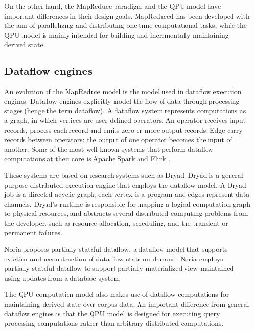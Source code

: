 On the other hand, the MapReduce paradigm and the QPU model have important differences in their design goals.
MapReduced has been developed with the aim of parallelizing and distributing one-time computational tasks,
while the QPU model is mainly intended for building and incrementally maintaining derived state.

\subsection{Dataflow engines}
An evolution of the MapReduce model is the model used in dataflow execution engines.
Dataflow engines explicitly model the flow of data through processing stages (henge the term dataflow).
A dataflow system represents computations as a graph, in which vertices are user-defined operators.
An operator receives input records, process each record and emits zero or more output records.
Edge carry records between operators; the output of one operator becomes the input of another.
Some of the most well known systems that perform dataflow computations at their core is
Apache Spark \cite{zaharia:spark} and Flink \cite{carbone:flink}.

These systems are based on research systems such as Dryad.
Dryad \cite{isard:dryad} is a general-purpose distributed execution engine that employs the dataflow model.
A Dryad job is a directed acyclic graph; each vertex is a program and edges represent data channels.
Dryad's runtime is responsible for mapping a logical computation graph to physical resources,
and abstracts several distributed computing problems from the developer,
such as resource allocation, scheduling, and the transient or permanent failures.

Noria \cite{gjengset:noria} proposes partially-stateful dataflow,
a dataflow model that supports eviction and reconstruction of data-flow state on demand.
Noria employs partially-stateful dataflow to support partially materialized view maintained
using updates from a database system.

The QPU computation model also makes use of dataflow computations for maintaining derived state
over corpus data.
An important difference from general dataflow engines is that the QPU model is designed for executing
query processing computations rather than arbitrary distributed computations.
